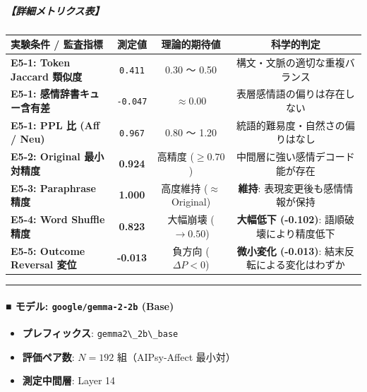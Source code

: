 \subparagraph{【詳細メトリクス表】}
\begin{center}
\small
\begin{tabular}{lccc}
\toprule
\textbf{実験条件 / 監査指標} & \textbf{測定値} & \textbf{理論的期待値} & \textbf{科学的判定} \\
\midrule
\textbf{E5-1: Token Jaccard 類似度} & \texttt{0.411} & 0.30 〜 0.50 & 構文・文脈の適切な重複バランス \\
\textbf{E5-1: 感情辞書キュー含有差} & \texttt{-0.047} & $\approx 0.00$ & 表層感情語の偏りは存在しない \\
\textbf{E5-1: PPL 比 (Aff / Neu)} & \texttt{0.967} & 0.80 〜 1.20 & 統語的難易度・自然さの偏りはなし \\
\textbf{E5-2: Original 最小対精度} & \textbf{0.924} & 高精度 ($\ge 0.70$) & 中間層に強い感情デコード能が存在 \\
\textbf{E5-3: Paraphrase 精度} & \textbf{1.000} & 高度維持 ($\approx$ Original) & \textbf{維持}: 表現変更後も感情情報が保持 \\
\textbf{E5-4: Word Shuffle 精度} & \textbf{0.823} & 大幅崩壊 ($\rightarrow 0.50$) & \textbf{大幅低下 (-0.102)}: 語順破壊により精度低下 \\
\textbf{E5-5: Outcome Reversal 変位} & \textbf{-0.013} & 負方向 ($\Delta P < 0$) & \textbf{微小変化 (-0.013)}: 結末反転による変化はわずか \\
\bottomrule
\end{tabular}
\end{center}


\vspace{0.5em}\hrule\vspace{0.5em}

\paragraph{■ モデル: \texttt{google/gemma-2-2b} (Base)}
\begin{itemize}
\item \textbf{プレフィックス}: \texttt{gemma2\textbackslash{}\_2b\textbackslash{}\_base}
\item \textbf{評価ペア数}: $N=192$ 組（AIPsy-Affect 最小対）
\item \textbf{測定中間層}: Layer 14
\end{itemize}

